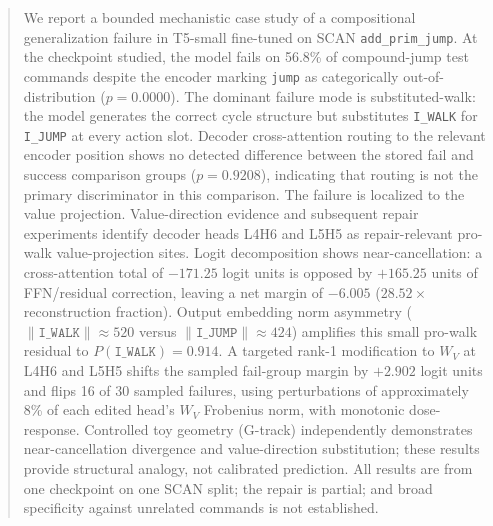 \begin{abstract}
We report a bounded mechanistic case study of a compositional generalization failure
in T5-small fine-tuned on SCAN \texttt{add\_prim\_jump}.
At the checkpoint studied, the model fails on 56.8\% of compound-jump test commands
despite the encoder marking \texttt{jump} as categorically out-of-distribution
($p=0.0000$).
The dominant failure mode is substituted-walk: the model generates the correct cycle
structure but substitutes \texttt{I\_WALK} for \texttt{I\_JUMP} at every action slot.
Decoder cross-attention routing to the relevant encoder position shows no detected
difference between the stored fail and success comparison groups ($p=0.9208$),
indicating that routing is not the primary discriminator in this comparison.
The failure is localized to the value projection.
Value-direction evidence and subsequent repair experiments identify decoder heads L4H6
and L5H5 as repair-relevant pro-walk value-projection sites.
Logit decomposition shows near-cancellation: a cross-attention total of $-171.25$
logit units is opposed by $+165.25$ units of FFN/residual correction, leaving a net
margin of $-6.005$ ($28.52\times$ reconstruction fraction).
Output embedding norm asymmetry ($\|\texttt{I\_WALK}\|\approx 520$ versus
$\|\texttt{I\_JUMP}\|\approx 424$) amplifies this small pro-walk residual to
$P(\texttt{I\_WALK})=0.914$.
A targeted rank-1 modification to $W_V$ at L4H6 and L5H5 shifts the sampled
fail-group margin by $+2.902$ logit units and flips 16 of 30 sampled failures,
using perturbations of approximately 8\% of each edited head's $W_V$ Frobenius norm,
with monotonic dose-response.
Controlled toy geometry (G-track) independently demonstrates near-cancellation
divergence and value-direction substitution; these results provide structural analogy,
not calibrated prediction.
All results are from one checkpoint on one SCAN split; the repair is partial; and
broad specificity against unrelated commands is not established.
\end{abstract}
